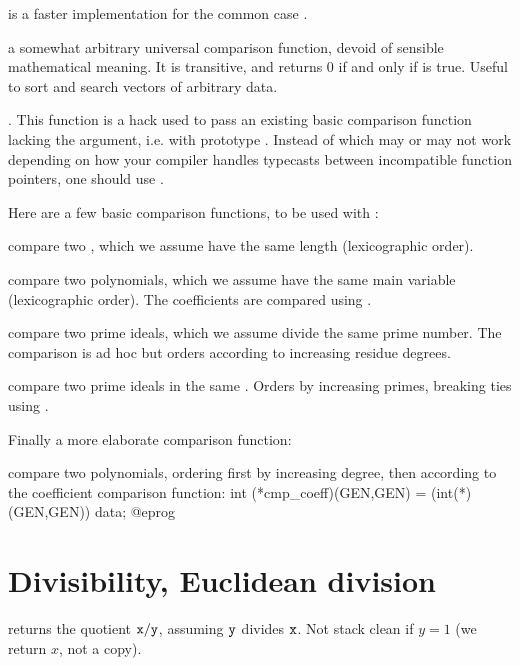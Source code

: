  is a faster
implementation for the common case .


 a somewhat arbitrary universal
comparison function, devoid of sensible mathematical meaning. It is
transitive, and returns 0 if and only if  is true.
Useful to sort and search vectors of arbitrary data.

. This function is a hack
used to pass an existing basic comparison function lacking the 
argument, i.e. with prototype . Instead of
 which may or may not work depending on how your
compiler handles typecasts between incompatible function pointers, one should
use .

Here are a few basic comparison functions, to be used with :

 compare two , which we assume have
the same length (lexicographic order).

 compare two polynomials, which we assume
have the same main variable (lexicographic order). The coefficients are
compared using .

 compare two prime ideals, which
we assume divide the same prime number. The comparison is ad hoc but orders
according to increasing residue degrees.

 compare two prime ideals in the same
. Orders by increasing primes, breaking ties using
.

Finally a more elaborate comparison function:

 compare two polynomials,
ordering first by increasing degree, then according to the coefficient
comparison function:
\bprog
  int (*cmp_coeff)(GEN,GEN) = (int(*)(GEN,GEN)) data;
@eprog

\section{Divisibility, Euclidean division}

 returns the quotient ${\tt x} / {\tt y}$,
assuming ${\tt y}$ divides ${\tt x}$. Not stack clean if $y = 1$
(we return $x$, not a copy).

